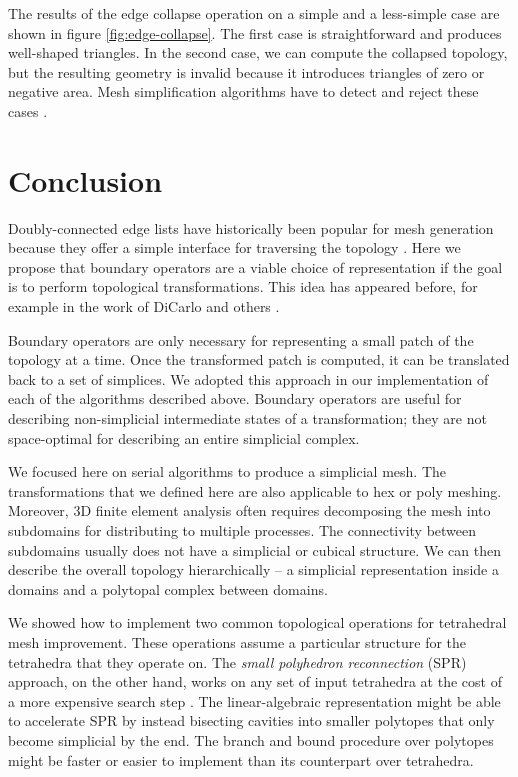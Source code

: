 \documentclass[twocolumn,leqno,twocolumn]{article}
\begin{document}
The results of the edge collapse operation on a simple and a less-simple case are shown in figure \ref{fig:edge-collapse}.
The first case is straightforward and produces well-shaped triangles.
In the second case, we can compute the collapsed topology, but the resulting geometry is invalid because it introduces triangles of zero or negative area.
Mesh simplification algorithms have to detect and reject these cases \cite{gueziec1995surface}.

\section{Conclusion}

Doubly-connected edge lists have historically been popular for mesh generation because they offer a simple interface for traversing the topology \cite{guibas1985primitives}.
Here we propose that boundary operators are a viable choice of representation if the goal is to perform topological transformations.
This idea has appeared before, for example in the work of DiCarlo and others \cite{dicarlo2007solid}.

Boundary operators are only necessary for representing a small patch of the topology at a time.
Once the transformed patch is computed, it can be translated back to a set of simplices.
We adopted this approach in our implementation of each of the algorithms described above.
Boundary operators are useful for describing non-simplicial intermediate states of a transformation; they are not space-optimal for describing an entire simplicial complex.

We focused here on serial algorithms to produce a simplicial mesh.
The transformations that we defined here are also applicable to hex or poly meshing.
Moreover, 3D finite element analysis often requires decomposing the mesh into subdomains for distributing to multiple processes.
The connectivity between subdomains usually does not have a simplicial or cubical structure.
We can then describe the overall topology hierarchically -- a simplicial representation inside a domains and a polytopal complex between domains.

We showed how to implement two common topological operations for tetrahedral mesh improvement.
These operations assume a particular structure for the tetrahedra that they operate on.
The \emph{small polyhedron reconnection} (SPR) approach, on the other hand, works on any set of input tetrahedra at the cost of a more expensive search step \cite{marot2020reviving}.
The linear-algebraic representation might be able to accelerate SPR by instead bisecting cavities into smaller polytopes that only become simplicial by the end.
The branch and bound procedure over polytopes might be faster or easier to implement than its counterpart over tetrahedra.
\end{document}
